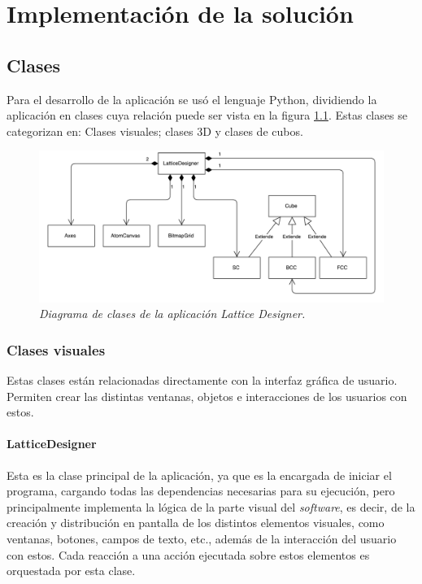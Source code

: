 \chapter{Implementación de la solución}
\label{chapter:implementacion}

\section{Clases}

Para el desarrollo de la aplicación se usó el lenguaje Python, dividiendo la aplicación en clases cuya relación puede ser vista en la figura \ref{fig:diagramaClases}. Estas clases se categorizan en: Clases visuales; clases 3D y clases de cubos.

\begin{figure}[ht]
  \centering
  \includegraphics[scale=.5]{images/diagramaClases}
  \caption{\em Diagrama de clases de la aplicación Lattice Designer.}
  \label{fig:diagramaClases}
\end{figure}

\subsection{Clases visuales}

Estas clases están relacionadas directamente con la interfaz gráfica de usuario. Permiten crear las distintas ventanas, objetos e interacciones de los usuarios con estos.

\subsubsection{LatticeDesigner}
Esta es la clase principal de la aplicación, ya que es la encargada de iniciar el programa, cargando todas las dependencias necesarias para su ejecución, pero principalmente implementa la lógica de la parte visual del \emph{software}, es decir, de la creación y distribución en pantalla de los distintos elementos visuales, como ventanas, botones, campos de texto, etc., además de la interacción del usuario con estos. Cada reacción a una acción ejecutada sobre estos elementos es orquestada por esta clase.


